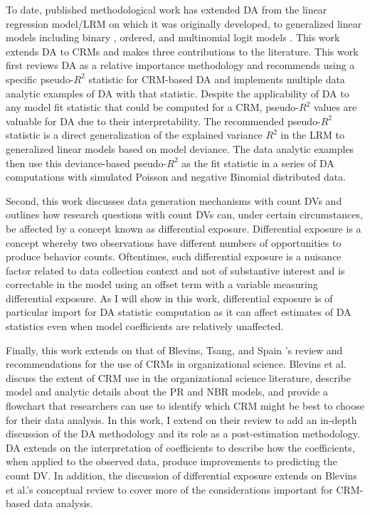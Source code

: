 \documentclass[ShortAfour,times,sageapa]{sagej}
\begin{document}
	To date, published methodological work has extended DA from the linear regression model/LRM on which it was originally developed, to generalized linear models including binary \cite{azen2009using}, ordered, and multinomial logit models \cite{luchman2014relative}.	
	This work extends DA to CRMs and makes three contributions to the literature.
	This work first reviews DA as a relative importance methodology and  recommends using a specific pseudo-$R^2$ statistic for CRM-based DA and implements multiple data analytic examples of DA with that statistic.
	Despite the applicability of DA to any model fit statistic that could be computed for a CRM, pseudo-$R^2$ values are valuable for DA due to their interpretability. 
	The recommended pseudo-$R^2$ statistic is a direct generalization of the explained variance $R^2$ in the LRM to generalized linear models based on model deviance.
	The data analytic examples then use this deviance-based pseudo-$R^2$ as the fit statistic in a series of DA computations with simulated Poisson and negative Binomial distributed data.
	
	Second, this work discusses data generation mechanisms with count DVs and outlines how research questions with count DVs can, under certain circumstances, be affected by a concept known as differential exposure.
	Differential exposure is a concept whereby two observations have different numbers of opportunities to produce behavior counts.
	Oftentimes, such differential exposure is a nuisance factor related to data collection context and not of substantive interest and is correctable in the model using an offset term with a variable measuring differential exposure.
	As I will show in this work, differential exposure is of particular import for DA statistic computation as it can affect estimates of DA statistics even when model coefficients are relatively unaffected.
	
	Finally, this work extends on that of Blevins, Tsang, and Spain \citeyear{blevins2015count}'s review and recommendations for the use of CRMs in organizational science. 
	Blevins et al. discuss the extent of CRM use in the organizational science literature, describe model and analytic details about the PR and NBR models, and provide a flowchart that researchers can use to identify which CRM might be best to choose for their data analysis.
	In this work, I extend on their review to add an in-depth discussion of the DA methodology and its role as a post-estimation methodology.
	DA extends on the interpretation of coefficients to describe how the coefficients, when applied to the observed data, produce improvements to predicting the count DV.
	In addition, the discussion of differential exposure extends on Blevins et al.'s conceptual review to cover more of the considerations important for CRM-based data analysis.
	
\end{document}
